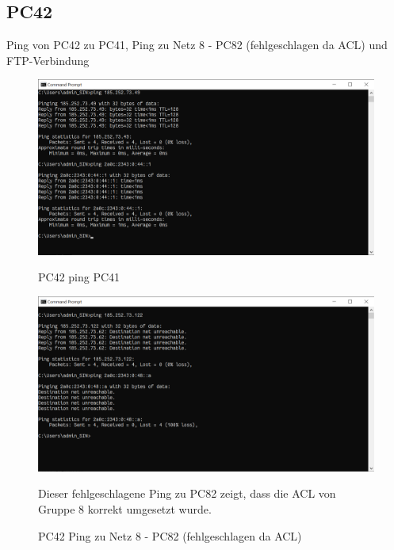 \documentclass{article}
\begin{document}
\subsection{PC42}
Ping von PC42 zu PC41, Ping zu Netz 8 - PC82 (fehlgeschlagen da ACL) und FTP-Verbindung\\
\begin{figure}[!htp]
  \centering
  \begin{minipage}[b]{0.25\textwidth}
    \includegraphics[width=\textwidth]{Arbeitsergebnisse/PC42/pc42_ping_PC41.png}
    \caption{PC42 ping PC41}
  \end{minipage}
  \hspace{0.8cm}
  \begin{minipage}[b]{0.25\textwidth}
    \includegraphics[width=\textwidth]{Arbeitsergebnisse/PC42/pc42_ping_failed.png}
    \caption{PC42 Ping zu Netz 8 - PC82 (fehlgeschlagen da ACL)}
    Dieser fehlgeschlagene Ping zu PC82 zeigt, dass die ACL von Gruppe 8 korrekt umgesetzt wurde.\\
  \end{minipage}
  \hspace{0.8cm}
  \begin{minipage}[b]{0.25\textwidth}

\end{minipage}
\end{figure}
\end{document}
